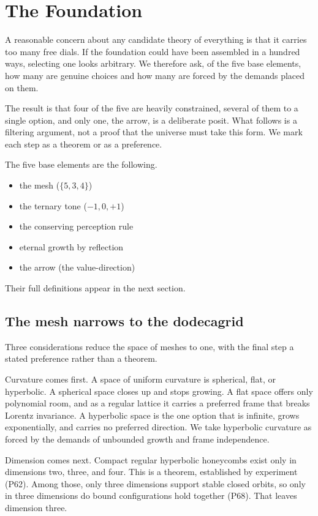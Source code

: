 \section{The Foundation}

A reasonable concern about any candidate theory of everything is that it carries too many free dials. If the foundation could have been assembled in a hundred ways, selecting one looks arbitrary. We therefore ask, of the five base elements, how many are genuine choices and how many are forced by the demands placed on them.

The result is that four of the five are heavily constrained, several of them to a single option, and only one, the arrow, is a deliberate posit. What follows is a filtering argument, not a proof that the universe must take this form. We mark each step as a theorem or as a preference.

The five base elements are the following.

\begin{itemize}
  \item the mesh ($\{5,3,4\}$)
  \item the ternary tone ($-1, 0, +1$)
  \item the conserving perception rule
  \item eternal growth by reflection
  \item the arrow (the value-direction)
\end{itemize}

Their full definitions appear in the next section.

\subsection{The mesh narrows to the dodecagrid}

Three considerations reduce the space of meshes to one, with the final step a stated preference rather than a theorem.

Curvature comes first. A space of uniform curvature is spherical, flat, or hyperbolic. A spherical space closes up and stops growing. A flat space offers only polynomial room, and as a regular lattice it carries a preferred frame that breaks Lorentz invariance. A hyperbolic space is the one option that is infinite, grows exponentially, and carries no preferred direction. We take hyperbolic curvature as forced by the demands of unbounded growth and frame independence.

Dimension comes next. Compact regular hyperbolic honeycombs exist only in dimensions two, three, and four. This is a theorem, established by experiment (P62). Among those, only three dimensions support stable closed orbits, so only in three dimensions do bound configurations hold together (P68). That leaves dimension three.

